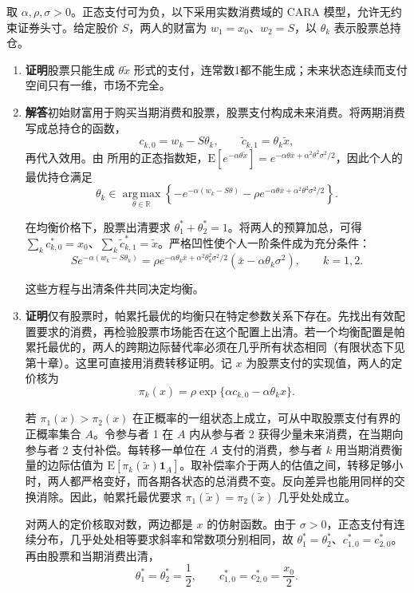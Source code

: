 \begin{solution}[blank-type=manual,blank-vsep=10\baselineskip]
取 $\alpha,\rho,\sigma>0$。正态支付可为负，以下采用实数消费域的 CARA 模型，允许无约束证券头寸。给定股价 $S$，两人的财富为 $w_1=x_0$、$w_2=S$，以 $\theta_k$ 表示股票总持仓。
\begin{enumerate}[label=(\alph*)]
\item \textbf{证明}\quad 股票只能生成 $\theta\widetilde x$ 形式的支付，连常数1都不能生成；未来状态连续而支付空间只有一维，市场不完全。
\item \textbf{解答}\quad 初始财富用于购买当期消费和股票，股票支付构成未来消费。将两期消费写成总持仓的函数，
\[
 c_{k,0}=w_k-S\theta_k,\qquad
 \widetilde c_{k,1}=\theta_k\widetilde x,
\]
再代入效用。由 所用的正态指数矩，$\mathrm E[e^{-\alpha\theta\widetilde x}]=e^{-\alpha\theta\bar x+\alpha^2\theta^2\sigma^2/2}$，因此个人的最优持仓满足
\[
 \theta_k\in\operatorname*{arg\,max}_{\theta\in\mathbb R}
 \left\{-e^{-\alpha(w_k-S\theta)}
 -\rho e^{-\alpha\theta\bar x+\alpha^2\theta^2\sigma^2/2}\right\}.
\]

在均衡价格下，股票出清要求 $\theta_1^*+\theta_2^*=1$。将两人的预算加总，可得 $\sum_k c_{k,0}^*=x_0$、$\sum_k\widetilde c_{k,1}^*=\widetilde x$。严格凹性使个人一阶条件成为充分条件：
\[
 S e^{-\alpha(w_k-S\theta_k)}
 =\rho e^{-\alpha\theta_k\bar x+\alpha^2\theta_k^2\sigma^2/2}
 (\bar x-\alpha\theta_k\sigma^2),\qquad k=1,2.
\]

这些方程与出清条件共同决定均衡。
\item \textbf{证明}\quad 仅有股票时，帕累托最优的均衡只在特定参数关系下存在。先找出有效配置要求的消费，再检验股票市场能否在这个配置上出清。若一个均衡配置是帕累托最优的，两人的跨期边际替代率必须在几乎所有状态相同\ifdefined\WJHandoutKnowledge（有限状态下见第十章）\fi。这里可直接用消费转移证明。记 $x$ 为股票支付的实现值，两人的定价核为
\[
 \pi_k(x)=\rho\exp\{\alpha c_{k,0}-\alpha\theta_k x\}.
\]

若 $\pi_1(x)>\pi_2(x)$ 在正概率的一组状态上成立，可从中取股票支付有界的正概率集合 $A$。令参与者 1 在 $A$ 内从参与者 2 获得少量未来消费，在当期向参与者 2 支付补偿。每转移一单位在 $A$ 支付的消费，参与者 $k$ 用当期消费衡量的边际估值为 $\mathrm E[\pi_k(\widetilde x)\mathbf 1_A]$。取补偿率介于两人的估值之间，转移足够小时，两人都严格变好，而各期各状态的总消费不变。反向差异也能用同样的交换消除。因此，帕累托最优要求 $\pi_1(\widetilde x)=\pi_2(\widetilde x)$ 几乎处处成立。

对两人的定价核取对数，两边都是 $x$ 的仿射函数。由于 $\sigma>0$，正态支付有连续分布，几乎处处相等要求斜率和常数项分别相同，故 $\theta_1^*=\theta_2^*$、$c_{1,0}^*=c_{2,0}^*$。再由股票和当期消费出清，
\[
 \theta_1^*=\theta_2^*=\frac12,\qquad
 c_{1,0}^*=c_{2,0}^*=\frac{x_0}{2}.
\]


\end{enumerate}
\end{solution}
